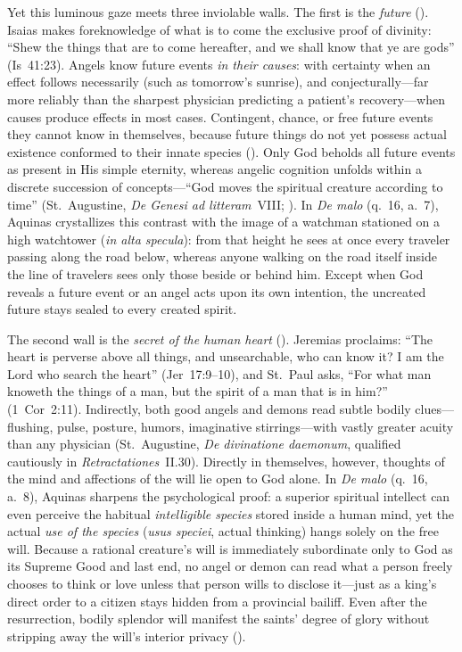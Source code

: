 Yet this luminous gaze meets three inviolable walls. The first is the \emph{future} (). Isaias makes foreknowledge of what is to come the exclusive proof of divinity: ``Shew the things that are to come hereafter, and we shall know that ye are gods'' (Is~41:23). Angels know future events \emph{in their causes}: with certainty when an effect follows necessarily (such as tomorrow's sunrise), and conjecturally---far more reliably than the sharpest physician predicting a patient's recovery---when causes produce effects in most cases. Contingent, chance, or free future events they cannot know in themselves, because future things do not yet possess actual existence conformed to their innate species (). Only God beholds all future events as present in His simple eternity, whereas angelic cognition unfolds within a discrete succession of concepts---``God moves the spiritual creature according to time'' (St.~Augustine, \emph{De Genesi ad litteram}~VIII; ). In \emph{De malo} (q.~16, a.~7), Aquinas crystallizes this contrast with the image of a watchman stationed on a high watchtower (\emph{in alta specula}): from that height he sees at once every traveler passing along the road below, whereas anyone walking on the road itself inside the line of travelers sees only those beside or behind him. Except when God reveals a future event or an angel acts upon its own intention, the uncreated future stays sealed to every created spirit.

The second wall is the \emph{secret of the human heart} (). Jeremias proclaims: ``The heart is perverse above all things, and unsearchable, who can know it? I am the Lord who search the heart'' (Jer~17:9--10), and St.~Paul asks, ``For what man knoweth the things of a man, but the spirit of a man that is in him?'' (1~Cor~2:11). Indirectly, both good angels and demons read subtle bodily clues---flushing, pulse, posture, humors, imaginative stirrings---with vastly greater acuity than any physician (St.~Augustine, \emph{De divinatione daemonum}, qualified cautiously in \emph{Retractationes}~II.30). Directly in themselves, however, thoughts of the mind and affections of the will lie open to God alone. In \emph{De malo} (q.~16, a.~8), Aquinas sharpens the psychological proof: a superior spiritual intellect can even perceive the habitual \emph{intelligible species} stored inside a human mind, yet the actual \emph{use of the species} (\emph{usus speciei}, actual thinking) hangs solely on the free will. Because a rational creature's will is immediately subordinate only to God as its Supreme Good and last end, no angel or demon can read what a person freely chooses to think or love unless that person wills to disclose it---just as a king's direct order to a citizen stays hidden from a provincial bailiff. Even after the resurrection, bodily splendor will manifest the saints' degree of glory without stripping away the will's interior privacy ().

